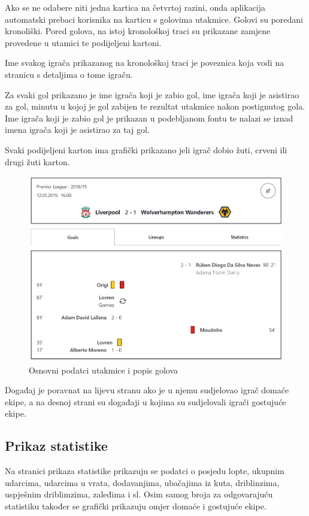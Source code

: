 \documentclass[times, utf8, zavrsni]{fer}
\begin{document}
Ako se ne odabere niti jedna kartica na četvrtoj razini, onda aplikacija automatski prebaci korisnika na karticu s golovima utakmice.
Golovi su poredani kronoliški. Pored golova, na istoj kronološkoj traci su prikazane zamjene provedene u utamici te podijeljeni kartoni.

Ime svakog igrača prikazanog na kronološkoj traci je poveznica koja vodi na stranicu s detaljima o tome igraču.

Za svaki gol prikazano je ime igrača koji je zabio gol, ime igrača koji je asistirao za gol, minutu u kojoj je gol zabijen te rezultat utakmice nakon postignutog gola.
Ime igrača koji je zabio gol je prikazan u podebljanom fontu te nalazi se iznad imena igrača koji je asistirao za taj gol.

Svaki podijeljeni karton ima grafički prikazano jeli igrač dobio žuti, crveni ili drugi žuti karton.

\begin{figure}[htb]
\centering
\includegraphics[width=12cm]{images/goals.jpg}
\caption{Osnovni podatci utakmice i popis golova}
\label{fig:goals}
\end{figure}

Događaj je poravnat na lijevu stranu ako je u njemu sudjelovao igrač domaće ekipe, a na desnoj strani su događaji u kojima su sudjelovali igrači gostujuće ekipe.

\subsection{Prikaz statistike}

Na stranici prikaza statistike prikazuju se podatci o posjedu lopte, ukupnim udarcima, udarcima u vrata, dodavanjima, ubačajima iz kuta, driblinzima, uspješnim driblimzima, zaleđima i sl.
Osim samog broja za odgovarajuću statistiku također se grafički prikazuju omjer domaće i gostujuće ekipe.
\end{document}
